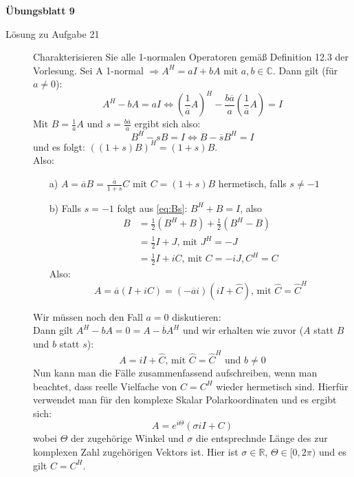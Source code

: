 \documentclass[a4paper,11pt]{scrartcl}
\newcommand{\mathC}{\mathbb{C}}
\newcommand{\mathR}{\mathbb{R}}
\begin{document}
\aihead

\begin{center}
  {\large\textbf{Übungsblatt 9}}
\end{center}


\begin{description}
\item[Lösung zu Aufgabe 21]
Charakterisieren Sie alle 1-normalen Operatoren gemäß Definition 12.3 der Vorlesung.
 \medskip
 \vspace{2cm}
 Sei A 1-normal $\Rightarrow A^H = a I + b A$ mit $a, b \in \mathC$. Dann gilt (für $a \neq 0$):
 \begin{equation*}
 A^H - b A = a I \Leftrightarrow \left(\frac{1}{\overline{a}}A\right)^H - \frac{b \overline{a}}{a}\left(\frac{1}{\overline{a}} A\right) = I
 \end{equation*}
 Mit $B = \frac{1}{\overline{a}} A$ und $s = \frac{b \overline{a}}{a}$ ergibt sich also:
 \begin{equation}
 \label{eq:Bs}
 B^H - s B = I \Leftrightarrow B - \overline{s} B^H = I
 \end{equation}
 und es folgt: $((1+s)B)^H = (1+s)B$.\\
 Also:
 \begin{itemize}
 \item [a)] $A = \overline{a} B = \frac{\overline{a}}{1+s} C$ mit $C = (1+s)B$ hermetisch, falls $s \neq -1$
 \item [b)] Falls $s = -1$ folgt aus \autoref{eq:Bs}: $B^H +B = I$, also 
 \begin{align*}
 B & = \frac{1}{2}(B^H + B) + \frac{1}{2}(B^H - B)\\
 & = \frac{1}{2} I + J \text{, mit } J^H = -J\\
 & = \frac{1}{2} I + i C \text{, mit } C = -iJ, C^H = C
 \end{align*}
 Also:
 \begin{equation}
 A = \overline{a} (I + iC) = (-\overline{a}i)(iI + \hat{C}) \text{, mit } \hat{C} = \hat{C}^H
 \end{equation}
 \end{itemize}
 Wir müssen noch den Fall $a = 0$ diskutieren:\\
 Dann gilt $A^H - bA = 0 = A - \overline{b}A^H$ und wir erhalten wie zuvor ($A$ statt $B$ und $b$ statt $s$):
 \begin{equation}
 A = iI+\hat{C} \text{, mit } \hat{C} = \hat{C}^H \text{ und } b\neq 0
 \end{equation}
 Nun kann man die Fälle zusammenfassend aufschreiben, wenn man beachtet, dass reelle Vielfache von $C = C^H$ wieder hermetisch sind. Hierfür verwendet man für den komplexe Skalar Polarkoordinaten und es ergibt sich:
 \begin{equation}
 A = e^{i\Theta}( \sigma i I + C)
 \end{equation}
 wobei $\Theta$ der zugehörige Winkel und $\sigma$ die entsprechnde Länge des zur komplexen Zahl zugehörigen Vektors ist. Hier ist $\sigma \in \mathR$, $\Theta \in [0,2\pi)$ und es gilt $C = C^H$.



\end{description}
\end{document}
